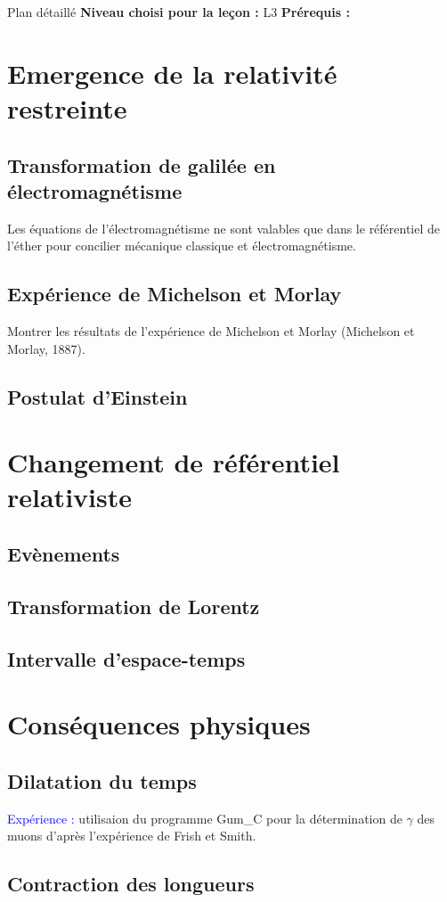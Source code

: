 \begin{reportBlock}{Plan détaillé}
  \textbf{Niveau choisi pour la leçon :} L3
  \newline
  \textbf{Prérequis : }
  \newline

\section*{}

\section{Emergence de la relativité restreinte}

\subsection{Transformation de galilée en électromagnétisme}
Les équations de l'électromagnétisme ne sont valables que dans le référentiel de l'éther pour concilier mécanique classique et électromagnétisme.
\subsection{Expérience de Michelson et Morlay}
Montrer les résultats de l'expérience de Michelson et Morlay (Michelson et Morlay, 1887). 

\subsection{Postulat d'Einstein}

\section{Changement de référentiel relativiste}

\subsection{Evènements}

\subsection{Transformation de Lorentz}

\subsection{Intervalle d'espace-temps}

\section{Conséquences physiques}
\subsection{Dilatation du temps}
\textcolor{blue}{Expérience :} utilisaion du programme Gum\_C pour la détermination de $\gamma$ des muons d'après l'expérience de Frish et Smith.
\subsection{Contraction des longueurs}

\end{reportBlock}
